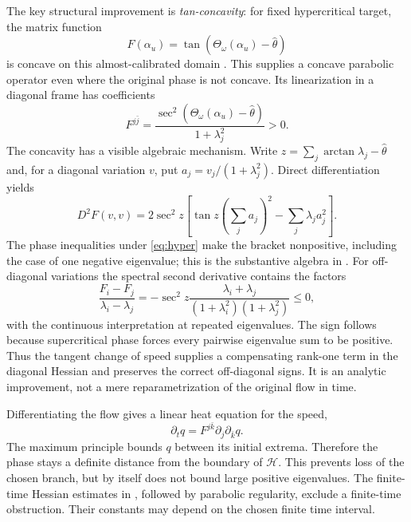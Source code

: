 \documentclass[12pt,reqno]{amsart}
\newcommand{\Th}{\Theta_\omega}
\newcommand{\hth}{\widehat\theta}
\begin{document}
The key structural improvement is \emph{tan-concavity}: for fixed hypercritical target, the matrix function
\[
 F(\alpha_u)=\tan(\Th(\alpha_u)-\hth)
\]
is concave on this almost-calibrated domain \cite[Theorem 1.1]{Tak}. This supplies a concave parabolic operator even where the original phase is not concave. Its linearization in a diagonal frame has coefficients
\[
 F^{j\bar j}=\frac{\sec^2(\Th(\alpha_u)-\hth)}{1+\lambda_j^2}>0.
\]
The concavity has a visible algebraic mechanism. Write $z=\sum_j\arctan\lambda_j-\hth$ and, for a diagonal variation $v$, put $a_j=v_j/(1+\lambda_j^2)$. Direct differentiation yields
\[
 D^2F(v,v)=2\sec^2z\left[\tan z\left(\sum_ja_j\right)^2
                                      -\sum_j\lambda_ja_j^2\right].
\]
The phase inequalities under \eqref{eq:hyper} make the bracket nonpositive, including the case of one negative eigenvalue; this is the substantive algebra in \cite[Section 3]{Tak}. For off-diagonal variations the spectral second derivative contains the factors
\[
 \frac{F_i-F_j}{\lambda_i-\lambda_j}
   =-\sec^2z\frac{\lambda_i+\lambda_j}
                    {(1+\lambda_i^2)(1+\lambda_j^2)}\leq0,
\]
with the continuous interpretation at repeated eigenvalues. The sign follows because supercritical phase forces every pairwise eigenvalue sum to be positive. Thus the tangent change of speed supplies a compensating rank-one term in the diagonal Hessian and preserves the correct off-diagonal signs. It is an analytic improvement, not a mere reparametrization of the original flow in time.

Differentiating the flow gives a linear heat equation for the speed,
\begin{equation}\label{eq:speed}
 \partial_tq=F^{j\bar k}\partial_j\partial_{\bar k}q.
\end{equation}
The maximum principle bounds $q$ between its initial extrema. Therefore the phase stays a definite distance from the boundary of $\mathcal H$. This prevents loss of the chosen branch, but by itself does not bound large positive eigenvalues. The finite-time Hessian estimates in \cite[Section 4]{Tak}, followed by parabolic regularity, exclude a finite-time obstruction. Their constants may depend on the chosen finite time interval.
\end{document}
